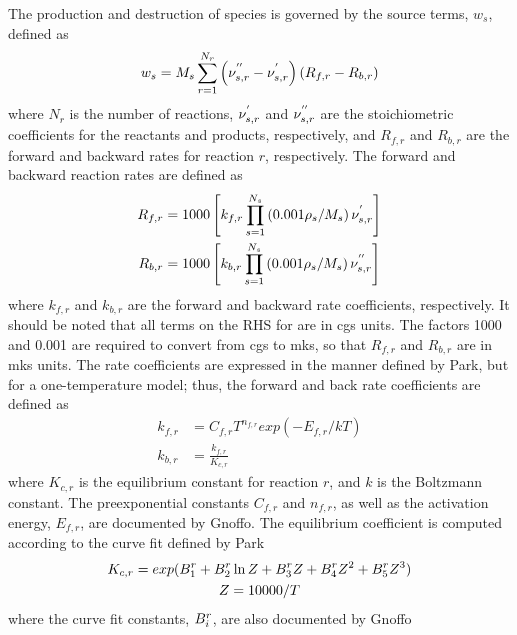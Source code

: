 The production and destruction of species is governed by the source terms,
$w_s$, defined as
\begin{equation}
  w_s = M_s \sum_{r=1}^{N_r}\left( \nu_{s,r}^{''} - \nu_{s,r}^{'} \right)
        \left( R_{f,r} - R_{b,r} \right)
  \label{source-term}
\end{equation}
where $N_r$ is the number of reactions, $\nu_{s,r}^{'}$ and $\nu_{s,r}^{''}$ are the
stoichiometric coefficients for the reactants and products, respectively, and
$R_{f,r}$ and $R_{b,r}$ are the forward and backward rates for reaction
$r$, respectively.  The forward and backward reaction rates are defined as
\begin{align}
  R_{f,r} &= 1000\left[ k_{f,r}\prod_{s=1}^{N_s}\left( 0.001\rho_s/M_s
  \right)\nu_{s,r}^{'} \right] \label{forward-rate} \\
  R_{b,r} &= 1000\left[ k_{b,r}\prod_{s=1}^{N_s}\left( 0.001\rho_s/M_s
  \right)\nu_{s,r}^{''} \right]
  \label{backward-rate}
\end{align}
where $k_{f,r}$ and $k_{b,r}$ are the forward and backward rate coefficients,
respectively.  It should be noted that all terms on the RHS for
 are in cgs units.  The factors 1000 and
0.001 are required to convert from cgs to mks, so that $R_{f,r}$ and $R_{b,r}$
are in mks units.  The rate coefficients are expressed in the manner defined by
Park\cite{park}, but for a one-temperature model; thus, the forward and back
rate coefficients are defined as
\begin{align}
  k_{f,r} &= C_{f,r}T^{n_{f,r}}exp\left( -E_{f,r}/kT \right)
  \label{forward-rate-coef} \\
  k_{b,r} &= \frac{k_{f,r}}{K_{c,r}}
  \label{backward-rate-coef}
\end{align}
where $K_{c,r}$ is the equilibrium constant for reaction $r$, and $k$ is the
Boltzmann constant.  The preexponential constants $C_{f,r}$ and $n_{f,r}$, as
well as the activation energy, $E_{f,r}$, are documented by
Gnoffo\cite{gnoffo-tp}.  The equilibrium coefficient is computed according to
the curve fit defined by Park\cite{park1985convergence}
\begin{gather}
  K_{c,r} = exp(B_{1}^{r} + B_{2}^{r}\ln{Z} + B_{3}^{r}Z + B_{4}^{r}Z^2 + B_{5}^{r}Z^3) \\
  Z = 10000/T
\end{gather}
where the curve fit constants, $B_{i}^{r}$, are also documented by
Gnoffo\cite{gnoffo-tp}

